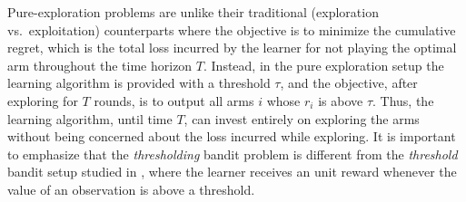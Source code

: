 %
%

Pure-exploration problems are unlike their traditional (exploration vs.\ exploitation) counterparts where the  objective is to minimize the cumulative regret, which is the total loss incurred by the learner for not playing the optimal arm throughout the time horizon $T$. Instead, in the pure exploration setup the learning algorithm is provided with a threshold $\tau$, and the objective, after exploring for $T$ rounds, is to  output all arms $i$ whose $r_{i}$ is above $\tau$. Thus, the learning algorithm, until  time $T$, can invest entirely on exploring the arms  without being concerned about the loss incurred while exploring. It is important to emphasize that the \emph{thresholding} bandit problem is different from the \emph{threshold} bandit setup studied in \cite{abernethy2016threshold}, where the learner receives an unit reward whenever the value of an observation is above a threshold. 



